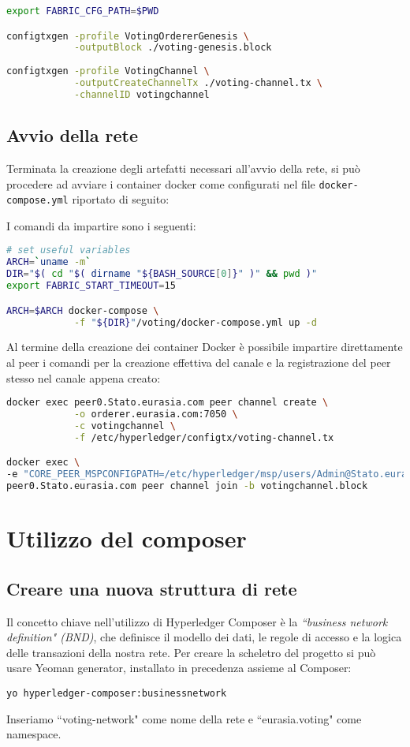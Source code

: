 \begin{lstlisting}[language=bash]
export FABRIC_CFG_PATH=$PWD

configtxgen -profile VotingOrdererGenesis \
			-outputBlock ./voting-genesis.block
			
configtxgen -profile VotingChannel \
			-outputCreateChannelTx ./voting-channel.tx \
			-channelID votingchannel
\end{lstlisting}

	\subsection{Avvio della rete}
		Terminata la creazione degli artefatti necessari all'avvio della rete, si può procedere ad avviare i container docker come configurati nel file \lstinline{docker-compose.yml} riportato di seguito:
		
		
		I comandi da impartire sono i seguenti:
		
\begin{lstlisting}[language=bash]
# set useful variables
ARCH=`uname -m`
DIR="$( cd "$( dirname "${BASH_SOURCE[0]}" )" && pwd )"
export FABRIC_START_TIMEOUT=15

ARCH=$ARCH docker-compose \
			-f "${DIR}"/voting/docker-compose.yml up -d
\end{lstlisting}

		Al termine della creazione dei container Docker è possibile impartire direttamente al peer i comandi per la creazione effettiva del canale e la registrazione del peer stesso nel canale appena creato:

\begin{lstlisting}[language=bash]
docker exec peer0.Stato.eurasia.com peer channel create \
			-o orderer.eurasia.com:7050 \
			-c votingchannel \
			-f /etc/hyperledger/configtx/voting-channel.tx

docker exec \
-e "CORE_PEER_MSPCONFIGPATH=/etc/hyperledger/msp/users/Admin@Stato.eurasia.com/msp" \
peer0.Stato.eurasia.com peer channel join -b votingchannel.block
\end{lstlisting}
	
\section{Utilizzo del composer}
	\subsection{Creare una nuova struttura di rete}
		Il concetto chiave nell'utilizzo di Hyperledger Composer è la \emph{``business network definition" (BND)}, che definisce il modello dei dati, le regole di accesso e la logica delle transazioni della nostra rete. Per creare la scheletro del progetto si può usare Yeoman generator, installato in precedenza assieme al Composer:
\begin{lstlisting}
yo hyperledger-composer:businessnetwork
\end{lstlisting}
		Inseriamo ``voting-network" come nome della rete e ``eurasia.voting" come namespace.
